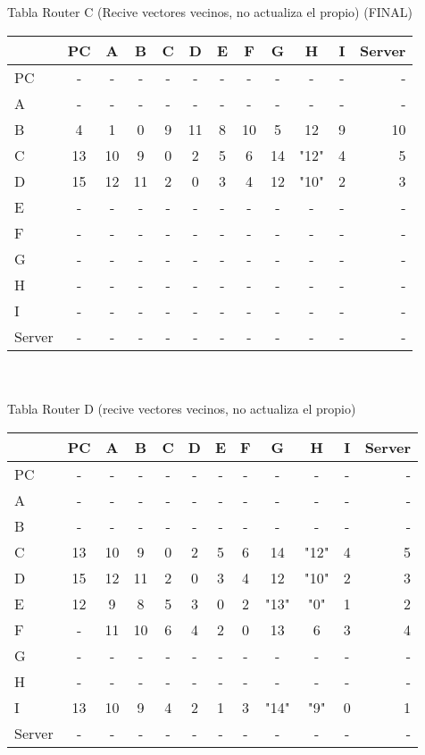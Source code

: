 \documentclass{article}
\begin{document}
\\
\\
Tabla Router C (Recive vectores vecinos, no actualiza el propio) (FINAL) \\
\begin{tabular}{l*{10}{c}r}
              & PC & A & B & C & D & E & F & G & H & I & Server \\
\hline
PC             & - & - & - & - & - & - & - & - & - & - & -\\
A              & - & - & - & - & - & - & - & - & - & - & -\\
B              & 4 & 1 & 0 & 9 & 11	& 8 & 10 & 5 & 12 & 9 & 10\\
C              & 13 & 10 & 9 & 0 & 2 & 5 & 6 & 14 & "12" & 4 & 5\\
D              & 15 & 12 & 11 & 2 & 0 & 3 & 4 & 12 & "10" & 2 & 3\\
E              & - & - & - & - & - & - & - & - & - & - & -\\
F              & - & - & - & - & - & - & - & - & - & - & -\\
G              & - & - & - & - & - & - & - & - & - & - & -\\
H              & - & - & - & - & - & - & - & - & - & - & -\\
I              & - & - & - & - & - & - & - & - & - & - & -\\
Server         & - & - & - & - & - & - & - & - & - & - & -\\
\end{tabular}
\\
\\
Tabla Router D (recive vectores vecinos, no actualiza el propio)	 \\
\begin{tabular}{l*{10}{c}r}
              & PC & A & B & C & D & E & F & G & H & I & Server \\
\hline
PC             & - & - & - & - & - & - & - & - & - & - & -\\
A              & - & - & - & - & - & - & - & - & - & - & -\\
B              & - & - & - & - & - & - & - & - & - & - & -\\
C              & 13 & 10 & 9 & 0 & 2 & 5 & 6 & 14 & "12" & 4 & 5\\
D              & 15 & 12 & 11 & 2 & 0 & 3 & 4 & 12 & "10" & 2 & 3\\
E              & 12 & 9 & 8 & 5 & 3 & 0 & 2 & "13" & "0" & 1 & 2\\
F              & - & 11 & 10 & 6 & 4 & 2 & 0 & 13 & 6 & 3 & 4\\
G              & - & - & - & - & - & - & - & - & - & - & -\\
H              & - & - & - & - & - & - & - & - & - & - & -\\
I              & 13 & 10 & 9 & 4 & 2 & 1 & 3 & "14" & "9" & 0 & 1\\
Server         & - & - & - & - & - & - & - & - & - & - & -\\

\end{tabular}\\
\end{document}
